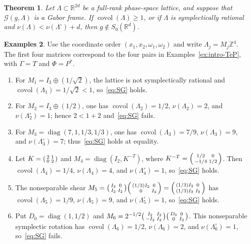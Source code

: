 \documentclass[11pt,reqno]{amsart}
\numberwithin{equation}{section}
\newtheorem{theorem}{Theorem}[section]
\theoremstyle{definition}
\newtheorem{examples}[theorem]{Examples}
\theoremstyle{remark}
\newcommand{\R}{\mathbb R}
\newcommand{\Z}{\mathbb Z}
\newcommand{\covol}{\operatorname{covol}}
\newcommand{\G}{\mathcal G}
\newcommand{\Szero}{S_0}
\begin{document}
\begin{theorem}
\label{thm:amalgam-balian-low}
Let $\Lambda\subset\R^{2d}$ be a full-rank phase-space lattice, and suppose
that $\G(g,\Lambda)$ is a Gabor frame.  If $\covol(\Lambda)\ge1$, or if
$\Lambda$ is symplectically rational and
$\nu(\Lambda)<\nu(\Lambda^\circ)+d$, then
$g\notin\Szero(\R^d)$.
\end{theorem}

\begin{examples}\label{ex:intro-SG}
Use the coordinate order $(x_1,x_2,\omega_1,\omega_2)$ and write
$\Lambda_j=M_j\Z^4$.  The first four matrices correspond to the four pairs
in Examples~\ref{ex:intro-TeP}, with $\Gamma=T$ and $\Phi=P^*$.
\begin{enumerate}[label=(\roman*)]
\item For $M_1=I_3\oplus(1/\sqrt2)$, the lattice is not symplectically rational and $\covol(\Lambda_1)=1/\sqrt2<1$, so~\eqref{eq:SG} holds.
\item For $M_2=I_3\oplus(1/2)$, one has $\covol(\Lambda_2)=1/2$, $\nu(\Lambda_2)=2$, and $\nu(\Lambda_2^\circ)=1$; hence $2<1+2$ and~\eqref{eq:SG} fails.
\item For $M_3=\operatorname{diag}(7,1,1/3,1/3)$, one has $\covol(\Lambda_3)=7/9$, $\nu(\Lambda_3)=9$, and $\nu(\Lambda_3^\circ)=7$; thus~\eqref{eq:SG} holds at equality.
\item Let $K=\begin{psmallmatrix}2&1\\0&2\end{psmallmatrix}$ and $M_4=\operatorname{diag}(I_2,K^{-T})$, where $K^{-T}=\begin{psmallmatrix}1/2&0\\-1/4&1/2\end{psmallmatrix}$.  Then $\covol(\Lambda_4)=1/4$, $\nu(\Lambda_4)=4$, and $\nu(\Lambda_4^\circ)=1$, so~\eqref{eq:SG} holds.
\item The nonseparable shear $M_5=\begin{psmallmatrix}I_2&0\\I_2&I_2\end{psmallmatrix}\begin{psmallmatrix}(1/3)I_2&0\\0&I_2\end{psmallmatrix}=\begin{psmallmatrix}(1/3)I_2&0\\(1/3)I_2&I_2\end{psmallmatrix}$ has $\covol(\Lambda_5)=1/9$, $\nu(\Lambda_5)=9$, and $\nu(\Lambda_5^\circ)=1$, so~\eqref{eq:SG} holds.
\item Put $D_0=\operatorname{diag}(1,1/2)$ and $M_6=2^{-1/2}\begin{psmallmatrix}I_2&I_2\\-I_2&I_2\end{psmallmatrix}\begin{psmallmatrix}D_0&0\\0&I_2\end{psmallmatrix}$.  This nonseparable symplectic rotation has $\covol(\Lambda_6)=1/2$, $\nu(\Lambda_6)=2$, and $\nu(\Lambda_6^\circ)=1$, so~\eqref{eq:SG} fails.
\end{enumerate}
\end{examples}
\end{document}
